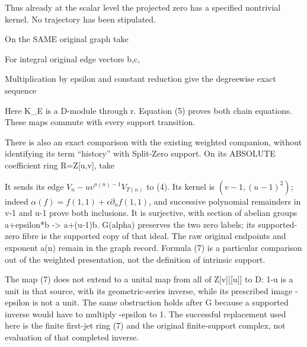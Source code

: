 
Thus already at the scalar level the projected zero has a specified
nontrivial kernel. No trajectory has been stipulated.

On the SAME original graph take


For integral original edge vectors b,c,


Multiplication by epsilon and constant reduction give the degreewise
exact sequence


Here K\_E is a D-module through r. Equation (5) proves both chain
equations. These maps commute with every support transition.

There is also an exact comparison with the existing weighted companion,
without identifying its term ``history'' with Split-Zero support. On its
ABSOLUTE coefficient ring R=Z{[}u,v{]}, take


It sends its edge \(V_n-u v^{a(n)-1}V_{T(n)}\) to (4). Its kernel is
\((v-1,(u-1)^2)\); indeed \(\alpha(f)=f(1,1)+\epsilon\partial_uf(1,1)\),
and successive polynomial remainders in v-1 and u-1 prove both
inclusions. It is surjective, with section of abelian groups a+epsilon*b
-\textgreater{} a+(u-1)b. G(alpha) preserves the two zero labels; its
supported-zero fibre is the supported copy of that ideal. The raw
original endpoints and exponent a(n) remain in the graph record. Formula
(7) is a particular comparison out of the weighted presentation, not the
definition of intrinsic support.

The map (7) does not extend to a unital map from all of
Z{[}v{]}{[}{[}u{]}{]} to D: 1-u is a unit in that source, with its
geometric-series inverse, while its prescribed image -epsilon is not a
unit. The same obstruction holds after G because a supported inverse
would have to multiply -epsilon to 1. The successful replacement used
here is the finite first-jet ring (7) and the original finite-support
complex, not evaluation of that completed inverse.

